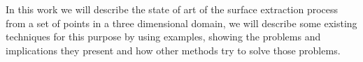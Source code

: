 %
In this work we will describe the state of art of the surface extraction process from a set of 
points in a three dimensional domain, we will describe some existing techniques for this purpose 
by using examples, showing the problems and implications they present and how other methods 
try to solve those problems.